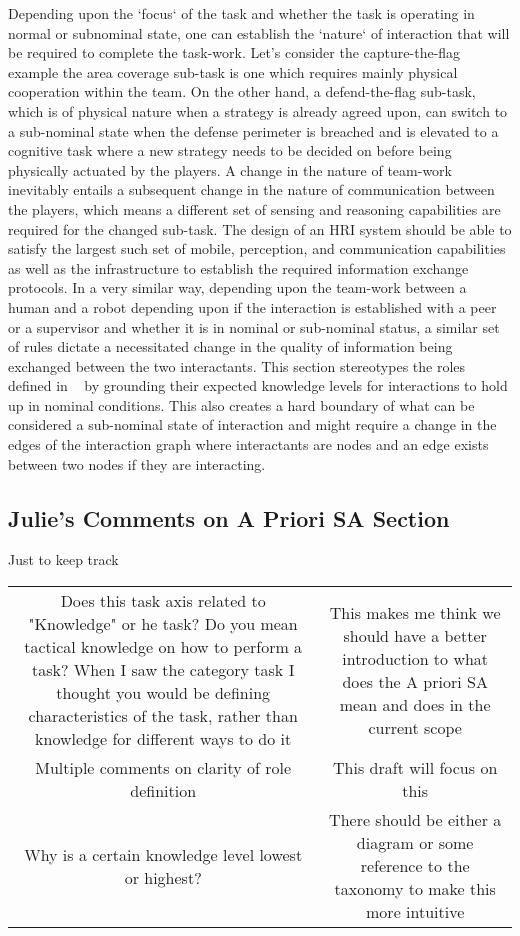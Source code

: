 \documentclass[letterpaper, 10 pt, conference]{ieeeconf}  %
\theoremstyle{definition}
\newcommand{\citet}[1]{\citeauthor{#1}~\cite{#1}}
\begin{document}
Depending upon the `focus` of the task and whether the task is operating in normal or subnominal
state, one can establish the `nature` of interaction that will be required to complete the
task-work. Let's consider the capture-the-flag example the area coverage sub-task is one which
requires mainly physical cooperation within the team. On the other hand, a defend-the-flag
sub-task, which is of physical nature when a strategy is already agreed upon, can switch to a
sub-nominal state when the defense perimeter is breached and is elevated to a cognitive task
where a new strategy needs to be decided on before being physically actuated by the players. A
change in the nature of team-work inevitably entails a subsequent change in the nature of
communication between the players, which means a different set of sensing and reasoning capabilities
are required for the changed sub-task. The design of an HRI system should be able to satisfy the
largest such set of mobile, perception, and communication capabilities as well as the infrastructure
to establish the required information exchange protocols. In a very similar way, depending upon the
team-work between a human and a robot depending upon if the interaction is established with a peer
or a supervisor and whether it is in nominal or sub-nominal status, a similar set of rules dictate a
necessitated change in the quality of information being exchanged between the two interactants. This
section stereotypes the roles defined in \citet{Goodrich2007,Scholtz2003} by grounding their
expected knowledge levels for interactions to hold up in nominal conditions. This also creates a
hard boundary of what can be considered a sub-nominal state of interaction and might require a
change in the edges of the interaction graph where interactants are nodes and an edge exists
between two nodes if they are interacting.


\subsection{Julie's Comments on A Priori SA Section}

Just to keep track

\begin{center} \begin{tabular}{c | c} \hline Does this task axis related to "Knowledge" or he
task? Do you mean tactical knowledge on how to perform a task? When I saw the category task I
thought you would be defining characteristics of the task, rather than knowledge for different
ways to do it & This makes me think we should have a better introduction to what does the A
priori SA mean and does in the current scope \\ Multiple comments on clarity of role definition &
This draft will focus on this \\ Why is a certain knowledge level lowest or highest? & There
should be either a diagram or some reference to the taxonomy to make this more intuitive \\
\end{tabular} \end{center}
\end{document}
